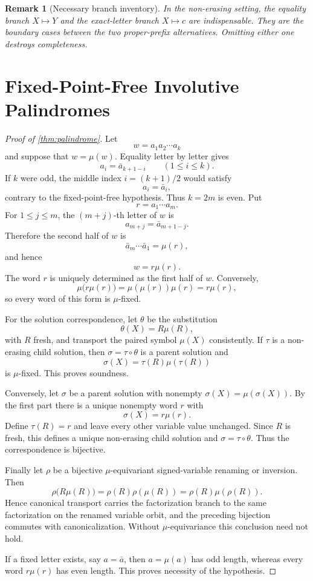 \documentclass[11pt]{article}
\newtheorem{remark}[theorem]{Remark}
\begin{document}
\begin{remark}[Necessary branch inventory]
In the non-erasing setting, the equality branch $X\mapsto Y$ and the exact-letter branch $X\mapsto c$ are indispensable. They are the boundary cases between the two proper-prefix alternatives. Omitting either one destroys completeness.
\end{remark}

\section{Fixed-Point-Free Involutive Palindromes}

\begin{proof}[Proof of \cref{thm:palindrome}]
Let
\[
  w=a_1a_2\cdots a_k
\]
and suppose that $w=\mu(w)$. Equality letter by letter gives
\[
  a_i=\bar a_{k+1-i}
  \qquad(1\le i\le k).
\]
If $k$ were odd, the middle index $i=(k+1)/2$ would satisfy
\[
  a_i=\bar a_i,
\]
contrary to the fixed-point-free hypothesis. Thus $k=2m$ is even. Put
\[
  r=a_1\cdots a_m.
\]
For $1\le j\le m$, the $(m+j)$-th letter of $w$ is
\[
  a_{m+j}=\bar a_{m+1-j}.
\]
Therefore the second half of $w$ is
\[
  \bar a_m\cdots\bar a_1=\mu(r),
\]
and hence
\[
  w=r\mu(r).
\]
The word $r$ is uniquely determined as the first half of $w$. Conversely,
\[
  \mu\bigl(r\mu(r)\bigr)
  =\mu(\mu(r))\mu(r)
  =r\mu(r),
\]
so every word of this form is $\mu$-fixed.

For the solution correspondence, let $\theta$ be the substitution
\[
  \theta(X)=R\mu(R),
\]
with $R$ fresh, and transport the paired symbol $\mu(X)$ consistently. If $\tau$ is a non-erasing child solution, then $\sigma=\tau\circ\theta$ is a parent solution and
\[
  \sigma(X)=\tau(R)\mu(\tau(R))
\]
is $\mu$-fixed. This proves soundness.

Conversely, let $\sigma$ be a parent solution with nonempty $\sigma(X)=\mu(\sigma(X))$. By the first part there is a unique nonempty word $r$ with
\[
  \sigma(X)=r\mu(r).
\]
Define $\tau(R)=r$ and leave every other variable value unchanged. Since $R$ is fresh, this defines a unique non-erasing child solution and $\sigma=\tau\circ\theta$. Thus the correspondence is bijective.

Finally let $\rho$ be a bijective $\mu$-equivariant signed-variable renaming or inversion. Then
\[
  \rho\bigl(R\mu(R)\bigr)
  =\rho(R)\rho(\mu(R))
  =\rho(R)\mu(\rho(R)).
\]
Hence canonical transport carries the factorization branch to the same factorization on the renamed variable orbit, and the preceding bijection commutes with canonicalization. Without $\mu$-equivariance this conclusion need not hold.

If a fixed letter exists, say $a=\bar a$, then $a=\mu(a)$ has odd length, whereas every word $r\mu(r)$ has even length. This proves necessity of the hypothesis.
\end{proof}
\end{document}

